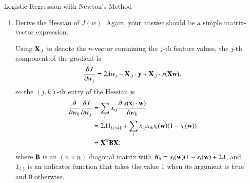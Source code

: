 \documentclass[section]{problemset}
\begin{document}
\begin{problem}{Logistic Regression with Newton's Method}
\begin{enumerate}
\begin{mdframed}
Note that $s'(\gamma) = \frac{e^{-\gamma}}{(1 + e^{-\gamma})^2} = s(\gamma)(1 - s(\gamma))$.

Let $s_i = s(\x_i^\T\w)$, so that $\grad_\w s_i = \x_i$. We have
\begin{align*}
  J(\w)     &= \lambda |\w|^2 - \sum_i y_i \log s_i + (1 - y_i) \log\(1 - s_i\),
\end{align*}
so
\begin{align*}
\grad J(\w) &= 2\lambda \w - \sum_i \frac{y_i}{s_i}(s_i)(1 - s_i)\x_i + \frac{1 - y_i}{1 - s_i}(-1)(s_i)(1 - s_i)\x_i \\
            &= 2\lambda \w - \sum_i \x_i\(y_i(1 - s_i) - (1 - y_i)s_i\) \\
            &= 2\lambda \w - \sum_i \x_i\(y_i - s_i\) \\
            &= 2\lambda \w - \X^\T\(\y - \s(\X\w)\) ~~~~~~~~~ (d \by 1)
\end{align*}
where $\s: \R^n \to \R^n$ applies $s$ componentwise to the rows.

We can interpret this expression a bit. $s(\X\w)$ is an $n$-vector containing
the predicted values for each sample point, so $\y - s(\X\w)$ is the error in
the current predicted values, and $\X^\T(\y - s(\X\w))$ is a $d$-vector whose
$j$-th component is large if feature $j$ is correlated with (has a large dot
product with) the current errors. So the steepest direction downhill will tend
to put more weight on features that are correlated with the current error in
the predictions.
\end{mdframed}



\item Derive the Hessian of $J(w)$.
Again, your answer should be a simple matrix-vector expression.

\begin{mdframed}
Using $\mathbf X_{.j}$ to denote the $n$-vector containing the $j$-th feature
values, the $j$-th component of the gradient is
\begin{align*}
  \frac{\partial J}{\partial w_j} = 2\lambda w_j - \mathbf X_{.j}\cdot \mathbf y + \mathbf X_{.j} \cdot s(\mathbf X\mathbf w),
\end{align*}
so the $(j,k)$-th entry of the Hessian is
\begin{align*}
  \frac{\partial }{\partial w_k}\frac{\partial J}{\partial w_j}
  &= \sum_i x_{ij} \frac{\partial ~s(\mathbf x_i\cdot \mathbf w)}{\partial w_k} \\
  &= 2\lambda 1_{\{j = k\}} + \sum_i x_{ij} x_{ik} s_i(\mathbf w)(1 - s_i(\mathbf w)) \\
  &= \mathbf X^{\mathbf{T}} \mathbf B \mathbf X,
\end{align*}
where $\mathbf B$ is an $(n \times n)$ diagonal matrix with
$B_{ii} = s_i(\mathbf w)(1-s_i(\mathbf w) + 2\lambda$, and $1_{\{\cdot\}}$ is an indicator
function that takes the value 1 when its argument is true and 0 otherwise.
\end{mdframed}


\end{enumerate}
\end{problem}
\end{document}
